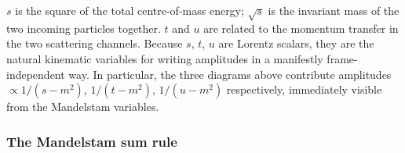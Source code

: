 \documentclass[../main.tex]{subfiles}
\begin{document}

\begin{remark}
$s$ is the square of the total centre-of-mass energy; $\sqrt{s}$ is the invariant mass of the two incoming particles together.  $t$ and $u$ are related to the momentum transfer in the two scattering channels.  Because $s$, $t$, $u$ are Lorentz scalars, they are the natural kinematic variables for writing amplitudes in a manifestly frame-independent way.  In particular, the three diagrams above contribute amplitudes $\propto 1/(s-m^2)$, $1/(t-m^2)$, $1/(u-m^2)$ respectively, immediately visible from the Mandelstam variables.
\end{remark}

\subsubsection*{The Mandelstam sum rule}

\end{document}
